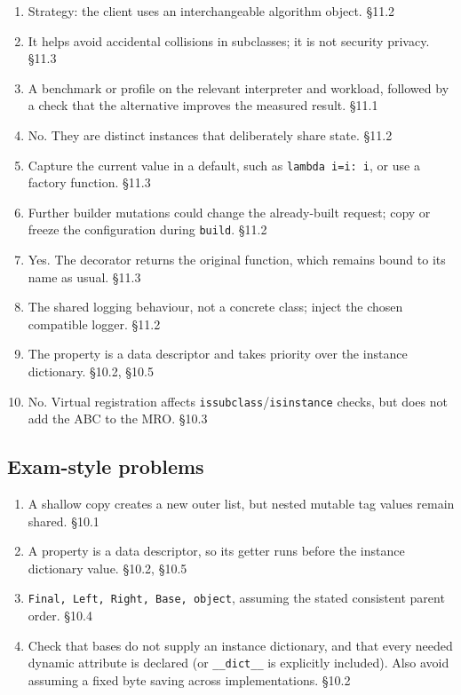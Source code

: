 \documentclass[11pt]{article}
\begin{document}
\begin{keepsection}
\begin{enumerate}
\item Strategy: the client uses an interchangeable algorithm object. \hfill{\small\color{FAUblue}§11.2}
\item It helps avoid accidental collisions in subclasses; it is not security privacy. \hfill{\small\color{FAUblue}§11.3}
\item A benchmark or profile on the relevant interpreter and workload, followed by a check that the alternative improves the measured result. \hfill{\small\color{FAUblue}§11.1}
\item No. They are distinct instances that deliberately share state. \hfill{\small\color{FAUblue}§11.2}
\item Capture the current value in a default, such as \texttt{lambda i=i: i}, or use a factory function. \hfill{\small\color{FAUblue}§11.3}
\item Further builder mutations could change the already-built request; copy or freeze the configuration during \texttt{build}. \hfill{\small\color{FAUblue}§11.2}
\item Yes. The decorator returns the original function, which remains bound to its name as usual. \hfill{\small\color{FAUblue}§11.3}
\item The shared logging behaviour, not a concrete class; inject the chosen compatible logger. \hfill{\small\color{FAUblue}§11.2}
\item The property is a data descriptor and takes priority over the instance dictionary. \hfill{\small\color{FAUblue}§10.2, §10.5}
\item No. Virtual registration affects \texttt{issubclass}/\texttt{isinstance} checks, but does not add the ABC to the MRO. \hfill{\small\color{FAUblue}§10.3}
\end{enumerate}

\end{keepsection}
\begin{keepsection}\subsection{Exam-style problems}

\begin{enumerate}
\item A shallow copy creates a new outer list, but nested mutable tag values remain shared. \hfill{\small\color{FAUblue}§10.1}
\item A property is a data descriptor, so its getter runs before the instance dictionary value. \hfill{\small\color{FAUblue}§10.2, §10.5}
\item \texttt{Final, Left, Right, Base, object}, assuming the stated consistent parent order. \hfill{\small\color{FAUblue}§10.4}
\item Check that bases do not supply an instance dictionary, and that every needed dynamic attribute is declared (or \texttt{\_\_dict\_\_} is explicitly included). Also avoid assuming a fixed byte saving across implementations. \hfill{\small\color{FAUblue}§10.2}
\end{enumerate}

\end{keepsection}
\end{document}
